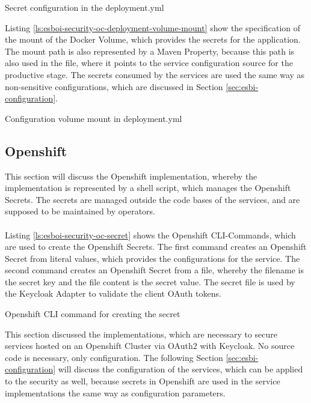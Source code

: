 \begin{listing}[h]
	\caption{Secret configuration in the deployment.yml}
	\label{ls:esboi-security-oc-deployment-volume-secret}
\end{listing}

Listing \vref{ls:esboi-security-oc-deployment-volume-mount} show the specification of the mount of the Docker Volume, which provides the secrets for the application. The mount path is also represented by a Maven Property, because this path is also used in the  file, where it points to the service configuration source for the productive stage. The secrets consumed by the services are used the same way as non-sensitive configurations, which are discussed in Section \vref{sec:esbi-configuration}.

\begin{listing}[h]
	\caption{Configuration volume mount in deployment.yml}
	\label{ls:esboi-security-oc-deployment-volume-mount}
\end{listing}

\subsection{Openshift}
\label{sec:esbi-security-openshift}
This section will discuss the Openshift implementation, whereby the implementation is represented by a shell script, which manages the Openshift Secrets. The secrets are managed outside the code bases of the services, and are supposed to be maintained by operators.
\\ \\
Listing \vref{ls:esboi-security-oc-secret} shows the Openshift CLI-Commands, which are used to create the Openshift Secrets. The first command creates an Openshift Secret from literal values, which provides the configurations for the service. The second command creates an Openshift Secret from a file, whereby the filename is the secret key and the file content is the secret value. The secret file is used by the Keycloak Adapter to validate the client OAuth tokens. 
\newpage 

\begin{listing}[h]
	\caption{Openshift CLI command for creating the secret}
	\label{ls:esboi-security-oc-secret}
\end{listing}

This section discussed the implementations, which are necessary to secure services hosted on an Openshift Cluster via OAuth2 with Keycloak. No source code is necessary, only configuration. The following Section \vref{sec:esbi-configuration} will discuss the configuration of the services, which can be applied to the security as well, because secrets in Openshift are used in the service implementations the same way as configuration parameters.

